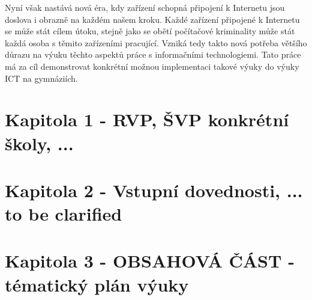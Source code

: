 \documentclass[a4paper, 12pt]{article}
\begin{document}
Nyní však nastává nová éra, kdy zařízení schopná připojení k Internetu jsou doslova i obrazně na každém našem kroku. Každé zařízení připojené k Internetu se může stát cílem útoku, stejně jako se obětí počítačové kriminality může stát každá osoba s těmito zařízeními pracující. Vzniká tedy takto nová potřeba většího důrazu na výuku těchto aspektů práce s informačními technologiemi. Tato práce má za cíl demonstrovat konkrétní možnou implementaci takové výuky do výuky ICT na gymnáziích.

\section{Kapitola 1 - RVP, ŠVP konkrétní školy, ...}

\section{Kapitola 2 - Vstupní dovednosti, ... to be clarified}


\section{Kapitola 3 - OBSAHOVÁ ČÁST - tématický plán výuky}
\end{document}
